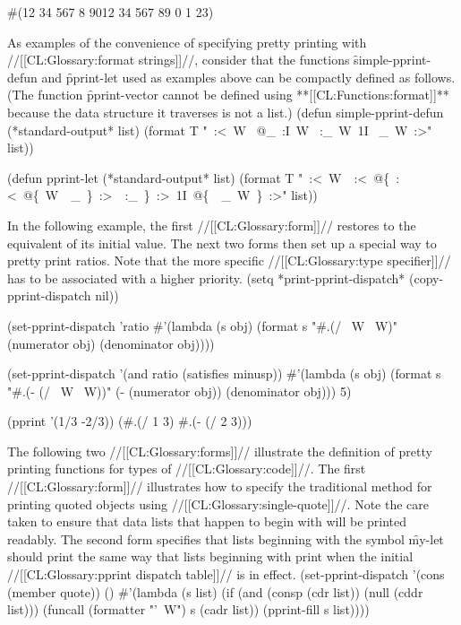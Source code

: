  #(12 34 567 8 
   9012 34 567 
   89 0 1 23) \endcode

As examples of the convenience of specifying pretty printing with  //[[CL:Glossary:format strings]]//, consider that the functions \f{simple-pprint-defun} and \f{pprint-let} used as examples above can be compactly defined as follows. (The function \f{pprint-vector} cannot be defined using **[[CL:Functions:format]]** because the data structure it traverses is not a list.)
  \code (defun simple-pprint-defun (*standard-output* list)
  (format T "~:<~W ~@_~:I~W ~:_~W~1I ~_~W~:>" list))

(defun pprint-let (*standard-output* list)
  (format T "~:<~W~{\hat}~:<~@\{~:<~@\{~W~{\hat}~_~\}~:>~{\hat}~:_~\}~:>~1I~@\{~{\hat}~_~W~\}~:>" list))  \endcode

In the following example, the first //[[CL:Glossary:form]]// restores  to the equivalent of its initial value. The next two forms then set up a special way to pretty print ratios. Note that the more specific //[[CL:Glossary:type specifier]]// has to be associated with a higher priority.
  \code
 (setq *print-pprint-dispatch* (copy-pprint-dispatch nil))

 (set-pprint-dispatch 'ratio
   #'(lambda (s obj)
       (format s "#.(/ ~W ~W)" 
                 (numerator obj) (denominator obj))))

 (set-pprint-dispatch '(and ratio (satisfies minusp))
   #'(lambda (s obj)
       (format s "#.(- (/ ~W ~W))" 
               (- (numerator obj)) (denominator obj)))
   5)

 (pprint '(1/3 -2/3))
 (#.(/ 1 3) \#.(- (/ 2 3))) \endcode

The following two //[[CL:Glossary:forms]]// illustrate the definition of  pretty printing functions for types of //[[CL:Glossary:code]]//.  The first //[[CL:Glossary:form]]// illustrates how to specify the traditional method  for printing quoted objects using //[[CL:Glossary:single-quote]]//.  Note the care taken to ensure that data lists that happen to begin with  will be printed readably.  The second form  specifies that lists beginning with the symbol \f{my-let} should print the same way that lists beginning with  print when the initial //[[CL:Glossary:pprint dispatch table]]// is in effect.
  \code
 (set-pprint-dispatch '(cons (member quote)) () 
   #'(lambda (s list)
       (if (and (consp (cdr list)) (null (cddr list)))
          (funcall (formatter "'~W") s (cadr list))
          (pprint-fill s list))))
 
